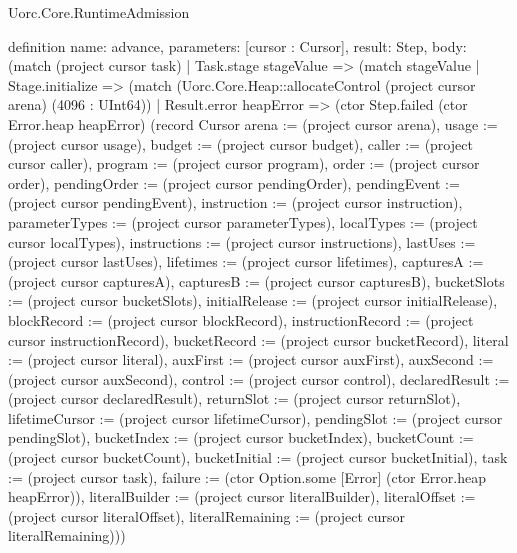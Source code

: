 \begin{lexlean}{Uorc.Core.RuntimeAdmission}
\begin{semanticmodule}
definition{
  name: advance,
  parameters: [cursor : Cursor],
  result: Step,
  body: (match (project cursor task)
    | Task.stage stageValue => (match stageValue
      | Stage.initialize => (match (Uorc.Core.Heap::allocateControl (project cursor arena) (4096 : UInt64))
        | Result.error heapError => (ctor Step.failed (ctor Error.heap heapError) (record Cursor {arena := (project cursor arena), usage := (project cursor usage), budget := (project cursor budget), caller := (project cursor caller), program := (project cursor program), order := (project cursor order), pendingOrder := (project cursor pendingOrder), pendingEvent := (project cursor pendingEvent), instruction := (project cursor instruction), parameterTypes := (project cursor parameterTypes), localTypes := (project cursor localTypes), instructions := (project cursor instructions), lastUses := (project cursor lastUses), lifetimes := (project cursor lifetimes), capturesA := (project cursor capturesA), capturesB := (project cursor capturesB), bucketSlots := (project cursor bucketSlots), initialRelease := (project cursor initialRelease), blockRecord := (project cursor blockRecord), instructionRecord := (project cursor instructionRecord), bucketRecord := (project cursor bucketRecord), literal := (project cursor literal), auxFirst := (project cursor auxFirst), auxSecond := (project cursor auxSecond), control := (project cursor control), declaredResult := (project cursor declaredResult), returnSlot := (project cursor returnSlot), lifetimeCursor := (project cursor lifetimeCursor), pendingSlot := (project cursor pendingSlot), bucketIndex := (project cursor bucketIndex), bucketCount := (project cursor bucketCount), bucketInitial := (project cursor bucketInitial), task := (project cursor task), failure := (ctor Option.some [Error] (ctor Error.heap heapError)), literalBuilder := (project cursor literalBuilder), literalOffset := (project cursor literalOffset), literalRemaining := (project cursor literalRemaining)}))
}
\end{semanticmodule}
\end{lexlean}
